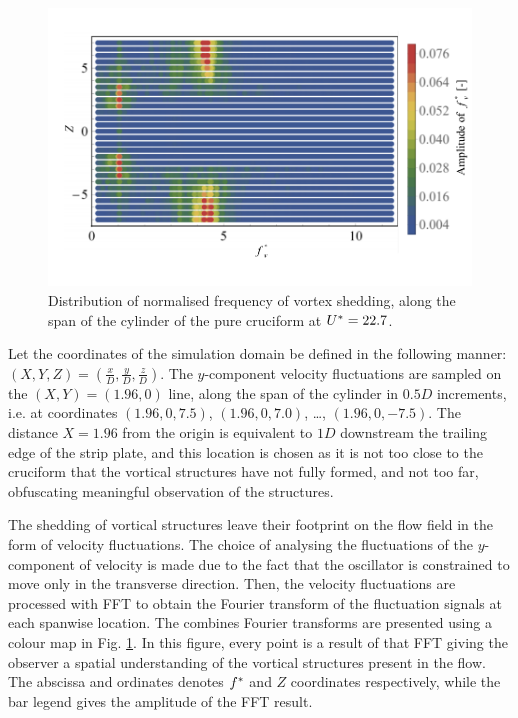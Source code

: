 \documentclass[oneside]{utmthesis}
\begin{document}
\begin{figure}
  \centering
\includegraphics[width=1\textwidth]{figs/probe90YU10}
\caption{Distribution of normalised frequency of vortex shedding, along the span of the cylinder of the pure cruciform at $U^{*} = 22.7$.}
  \label{fig:probe90YU10}
\end{figure}

Let the coordinates of the simulation domain be defined in the following manner: $\left( X, Y, Z \right) = \left( \frac{x}{D}, \frac{y}{D}, \frac{z}{D} \right)$. The $y$-component velocity fluctuations are sampled on the $\left ( X, Y \right ) = \left ( 1.96, 0 \right )$ line, along the span of the cylinder in $0.5D$ increments, i.e. at coordinates $\left ( 1.96, 0, 7.5 \right )$, $\left ( 1.96, 0, 7.0 \right )$, \dots, $\left ( 1.96, 0, -7.5 \right )$. The distance $X = 1.96$ from the origin is equivalent to $1D$ downstream the trailing edge of the strip plate, and this location is chosen as it is not too close to the cruciform that the vortical structures have not fully formed, and not too far, obfuscating meaningful observation of the structures.

The shedding of vortical structures leave their footprint on the flow field in the form of velocity fluctuations. The choice of analysing the fluctuations of the $y$-component of velocity is made due to the fact that the oscillator is constrained to move only in the transverse direction. Then, the velocity fluctuations are processed with FFT to obtain the Fourier transform of the fluctuation signals at each spanwise location. The combines Fourier transforms are presented using a colour map in Fig. \ref{fig:probe90YU10}. In this figure, every point is a result of that FFT giving the observer a spatial understanding of the vortical structures present in the flow. The abscissa and ordinates denotes $f^{*}$ and $Z$ coordinates respectively, while the bar legend gives the amplitude of the FFT result.
\end{document}
